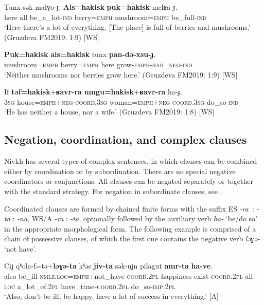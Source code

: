 \documentclass[output=paper,colorlinks,citecolor=brown]{langscibook}
\begin{document}
\ea\label{ex:niv:148}
    \gll Tunx sək malɣo-ɟ. \textbf{Als=hakisk} \textbf{puk=hakisk} melʁa-ɟ. \\ 
         here all be\_a\_lot-\textsc{ind} berry=\textsc{emph} mushroom=\textsc{emph} be\_full-\textsc{ind} \\
    \glt ‘Here there’s a lot of everything. [The place] is full of berries and mushrooms.’ (Gruzdeva FM2019: 1:9) [WS]
\z 

\ea\label{ex:niv:149}
    \gll \textbf{Puk=hakisk} \textbf{als=hakisk} tunx \textbf{pan-də-xsu-ɟ}. \\ 
         mushroom=\textsc{emph} berry=\textsc{emph} here grow-\textsc{emph-hab\_neg-ind} \\
    \glt ‘Neither mushrooms nor berries grow here.’ (Gruzdeva FM2019: 1:9) [WS]
\z 

\ea\label{ex:niv:150}
    \gll If \textbf{təf=hakisk}+\textbf{ʁavr-ra} \textbf{umgu=hakisk}+\textbf{ʁavr-ra} ha-ɟ.\\
         \textsc{3sg} house=\textsc{emph}+\textsc{neg-coord.3sg} woman=\textsc{emph+neg-coord.3sg} do\_so{}-\textsc{ind}\\
    \glt ‘He has neither a house, nor a wife.’ (Gruzdeva FM2019: 1:8) [WS]
\z 

\subsection{Negation, coordination, and complex clauses}\label{sec:niv:4.5}

Nivkh has several types of complex sentences, in which clauses can be combined either by coordination or by subordination. There are no special negative coordinators or conjunctions. All clauses can be negated separately or together with the standard strategy. For negation in subordinate clauses, see  .

Coordinated clauses are formed by chained finite forms with the suffix ES \textit{-ra}~: \textit{-ta }: \textit{-na}, WS/A \textit{-ra }: \textit{-ta}, optionally followed by the auxiliary verb \textit{ha-} ‘be/do so’ in the appropriate morphological form. The following example  is comprised of a chain of possessive clauses, of which the first one contains the negative verb \textit{ləɣə{}-} ‘not have’.

\ea\label{ex:niv:151}
    \gll Cij qʰola-f=tə+\textbf{ləɣə{}-ta} kʰəs \textbf{jiv-ta} sək-ujn pilagut \textbf{amr-ta} \textbf{ha-ve}. \\ 
         also be\_ill-\textsc{nmlz.loc=emph}+not\_have-\textsc{coord.2pl} happiness exist-\textsc{coord.2pl} all-\textsc{loc} a\_lot\_of.\textsc{2pl} have\_time-\textsc{coord.2pl} do\_so-\textsc{imp.2pl} \\
    \glt ‘Also, don’t be ill, be happy, have a lot of success in everything.’ \citep{Jushkina2019} [A]
\z 
\end{document}
